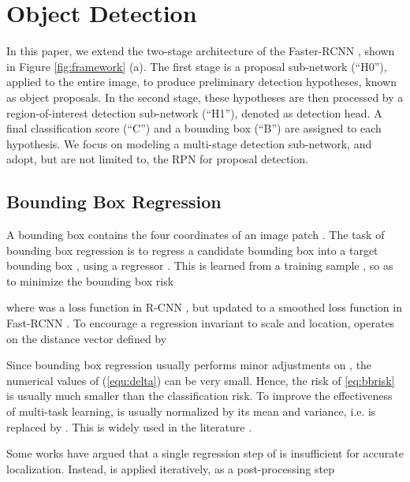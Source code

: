 \documentclass[10pt,twocolumn,letterpaper]{article}
\begin{document}
\section{Object Detection}

In this paper, we extend the two-stage architecture of the
Faster-RCNN \cite{DBLP:conf/nips/RenHGS15,lin2017feature}, shown in
Figure \ref{fig:framework} (a). The first stage is a proposal sub-network
(``H0''), applied to the entire image, to produce preliminary detection
hypotheses, known as object proposals. In the second stage, these
hypotheses are then processed by a region-of-interest detection
sub-network (``H1''), denoted as detection head. A final classification
score (``C'') and a bounding box (``B'') are assigned to each hypothesis.
We focus on modeling a multi-stage detection sub-network, and adopt, but
are not limited to, the RPN \cite{DBLP:conf/nips/RenHGS15} for proposal
detection.


\subsection{Bounding Box Regression}
\label{subsec:bbox}

A bounding box  contains the four coordinates of
an image patch . The task of bounding box
regression is to regress a candidate bounding box  into a target
bounding box , using a regressor . This is
learned from a training sample
, so as to minimize the bounding box risk

where  was a  loss function in R-CNN \cite{DBLP:conf/cvpr/GirshickDDM14}, but updated to a smoothed  loss function in Fast-RCNN \cite{DBLP:conf/iccv/Girshick15}. To encourage a regression invariant to scale and location,  operates on the distance vector  defined by

Since bounding box regression usually performs minor adjustments on , the numerical values of (\ref{equ:delta}) can be very
small. Hence, the risk of \eqref{eq:bbrisk} is usually much smaller
than the classification risk. To improve the effectiveness of multi-task
learning,  is usually normalized by its mean and variance, i.e.
 is replaced by . This is widely
used in the literature \cite{DBLP:conf/nips/RenHGS15,DBLP:conf/eccv/CaiFFV16,DBLP:conf/nips/DaiLHS16,lin2017feature,he2017mask}.

Some works \cite{DBLP:conf/iccv/GidarisK15,DBLP:conf/bmvc/GidarisK16,DBLP:conf/cvpr/HeZRS16} have argued that a single regression step of  is insufficient
for accurate localization. Instead,  is applied iteratively, as a
post-processing step
\end{document}
